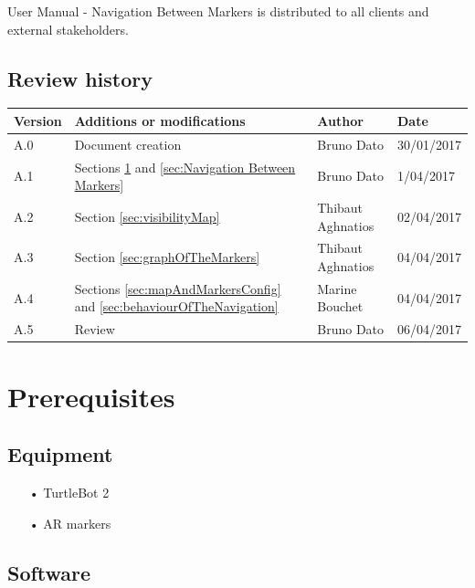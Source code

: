 \documentclass[10pt,a4paper]{article}
\begin{document}
User Manual - Navigation Between Markers is distributed to all clients and external stakeholders.

\subsection*{Review history}

\begin{center}
    \begin{tabular}{| l | l | l | l |}
    \hline
     \rowcolor{gray} Version & Additions or modifications & Author & Date \\ \hline
    A.0 & Document creation & Bruno Dato & 30/01/2017\\ \hline
    A.1 & Sections \ref{sec:Prerequisites} and \ref{sec:Navigation Between Markers} & Bruno Dato & 1/04/2017\\ \hline
    A.2 & Section \ref{sec:visibilityMap} & Thibaut Aghnatios & 02/04/2017\\ \hline
    A.3 & Section \ref{sec:graphOfTheMarkers} & Thibaut Aghnatios & 04/04/2017\\ \hline
    A.4 & Sections \ref{sec:mapAndMarkersConfig} and \ref{sec:behaviourOfTheNavigation} & Marine Bouchet & 04/04/2017\\ \hline
    A.5 & Review  & Bruno Dato & 06/04/2017\\ \hline
     
    \end{tabular}
\end{center}

\newpage
\tableofcontents
\newpage
	

\section{Prerequisites}
\label{sec:Prerequisites}

\subsection{Equipment}

\begin{itemize}
\item[•] TurtleBot 2
\item[•] AR markers 
\end{itemize}

\subsection{Software}
\end{document}
